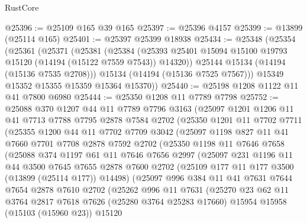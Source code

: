 \begin{lexlean}{RustCore}
\begin{coremodule}
@25396 := @25109 @165 @39 @165
@25397 := @25396 @4157
@25399 := @13899 (@25114 @165)
@25401 := @25397 @25399 @18938
@25434 := @25348
    (@25354
      (@25361
        (@25371
          (@25381
            (@25384
              (@25393 @25401 @15094 @15100 @19793 @15120 (@14194 (@15122 @7559 @7543)) @14320))
            @25144
            @15134
            (@14194 (@15136 @7535 @2708)))
          @15134
          (@14194 (@15136 @7525 @7567)))
        @15349
        @15352
        @15355
        @15359
        @15364
        @15370))
@25440 := @25198 @1208 @1122 @11 @41 @7800 @6980
@25444 := @25350 @1208 @11 @7789 @7798
@25752 := @25088
    @370
    @1207
    @44
    @11
    @7789
    @7796
    @3163
    (@25097
      @1201
      @1206
      @11
      @41
      @7713
      @7788
      @7795
      @2878
      @7584
      @2702
      (@25350
        @1201
        @11
        @7702
        @7711
        (@25355
          @1200
          @44
          @11
          @7702
          @7709
          @3042
          (@25097
            @1198
            @827
            @11
            @41
            @7660
            @7701
            @7708
            @2878
            @7592
            @2702
            (@25350
              @1198
              @11
              @7646
              @7658
              (@25088
                @374
                @1197
                @61
                @11
                @7646
                @7656
                @2997
                (@25097
                  @231
                  @1196
                  @11
                  @44
                  @3500
                  @7645
                  @7655
                  @2878
                  @7600
                  @2702
                  (@25109 @177 @11 @177 @3500 (@13899 (@25114 @177)) @14498)
                  (@25097
                    @996
                    @384
                    @11
                    @41
                    @7631
                    @7644
                    @7654
                    @2878
                    @7610
                    @2702
                    (@25262
                      @996
                      @11
                      @7631
                      (@25270
                        @23
                        @62
                        @11
                        @3764
                        @2817
                        @7618
                        @7626
                        (@25280 @3764 @25283 @17660)
                        @15954
                        @15958
                        (@15103 (@15960 @23))
                        @15120

\end{coremodule}
\end{lexlean}
